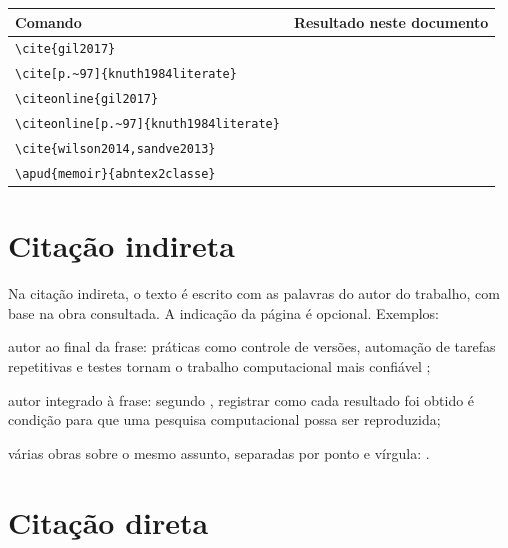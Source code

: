 \documentclass[
	12pt, %
	openright, %
	oneside, %
	a4paper, %
	sumario=tradicional, %
	english, %
	brazil, %
]{abntex2}
\begin{document}
\begin{quadro}[htbp]
	\caption{Comandos de citação}\label{qua:comandos-citacao}
	\centering
	\footnotesize
	\begin{tabular}{p{}p{}}
		\toprule
		\textbf{Comando} & \textbf{Resultado neste documento} \\
		\midrule
		\verb|\cite{gil2017}| & \cite{gil2017} \\
		\verb|\cite[p.~97]{knuth1984literate}| & \cite[p.~97]{knuth1984literate} \\
		\verb|\citeonline{gil2017}| & \citeonline{gil2017} \\
		\verb|\citeonline[p.~97]{knuth1984literate}| & \citeonline[p.~97]{knuth1984literate} \\
		\verb|\cite{wilson2014,sandve2013}| & \cite{wilson2014,sandve2013} \\
		\verb|\apud{memoir}{abntex2classe}| & \apud{memoir}{abntex2classe} \\
		\bottomrule
	\end{tabular}
\end{quadro}

\section{Citação indireta}\label{sec:citacao-indireta}

Na citação indireta, o texto é escrito com as palavras do autor do trabalho, com base na obra consultada. A indicação da página é opcional. Exemplos:

\begin{alineas}
	\item autor ao final da frase: práticas como controle de versões, automação de tarefas repetitivas e testes tornam o trabalho computacional mais confiável \cite{wilson2014};
	\item autor integrado à frase: segundo , registrar como cada resultado foi obtido é condição para que uma pesquisa computacional possa ser reproduzida;
	\item várias obras sobre o mesmo assunto, separadas por ponto e vírgula: \cite{wilson2014,wilson2017,sandve2013}.
\end{alineas}

\section{Citação direta}\label{sec:citacao-direta}
\end{document}
